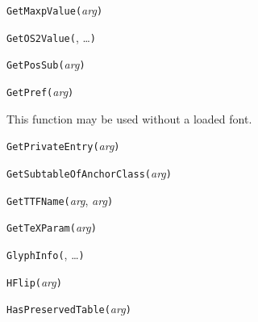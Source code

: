 \texttt{GetMaxpValue(}\textit{arg}\texttt{)}



\texttt{GetOS2Value(}, \ldots\texttt{)}



\texttt{GetPosSub(}\textit{arg}\texttt{)}



\texttt{GetPref(}\textit{arg}\texttt{)}

This function may be used without a loaded font.



\texttt{GetPrivateEntry(}\textit{arg}\texttt{)}



\texttt{GetSubtableOfAnchorClass(}\textit{arg}\texttt{)}



\texttt{GetTTFName(}\textit{arg}, \textit{arg}\texttt{)}



\texttt{GetTeXParam(}\textit{arg}\texttt{)}



\texttt{GlyphInfo(}, \ldots\texttt{)}



\texttt{HFlip(}\textit{arg}\texttt{)}



\texttt{HasPreservedTable(}\textit{arg}\texttt{)}



